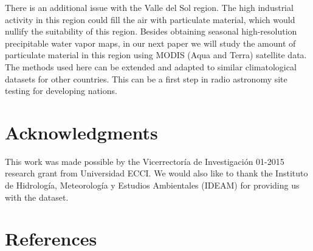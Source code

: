 \documentclass[12pt]{iopart}
\begin{document}
There is an additional issue with the Valle del Sol region. The high industrial activity in this region could fill the air with particulate material, which would nullify the suitability of this region. Besides obtaining seasonal high-resolution precipitable water vapor maps, in our next paper we will study the amount of particulate material in this region using MODIS (Aqua and Terra) satellite data.\\
  
The methods used here can be extended and adapted to similar climatological datasets for other countries. This can be a first step in radio astronomy site testing for developing nations.

\section*{Acknowledgments}

This work was made possible by the Vicerrector\'ia de Investigaci\'on 01-2015 research grant from Universidad ECCI. We would also like to thank the Instituto de Hidrolog\'ia, Meteorolog\'ia y Estudios Ambientales (IDEAM) for providing us with the dataset.


 \section*{References}
 

  
  
\end{document}

